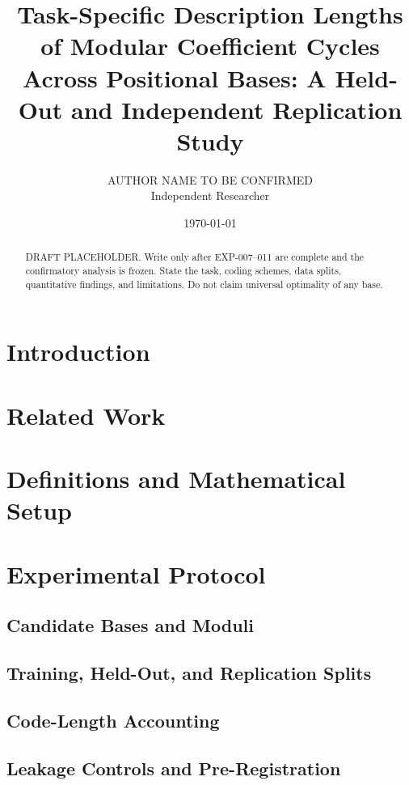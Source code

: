 \documentclass[11pt]{article}
\title{Task-Specific Description Lengths of Modular Coefficient Cycles Across Positional Bases: A Held-Out and Independent Replication Study}
\author{AUTHOR NAME TO BE CONFIRMED\\Independent Researcher}
\date{\today}
\begin{document}
\maketitle

\begin{abstract}
DRAFT PLACEHOLDER. Write only after EXP-007--011 are complete and the confirmatory analysis is frozen. State the task, coding schemes, data splits, quantitative findings, and limitations. Do not claim universal optimality of any base.
\end{abstract}

\section{Introduction}

\section{Related Work}

\section{Definitions and Mathematical Setup}

\section{Experimental Protocol}
\subsection{Candidate Bases and Moduli}
\subsection{Training, Held-Out, and Replication Splits}
\subsection{Code-Length Accounting}
\subsection{Leakage Controls and Pre-Registration}
\end{document}
